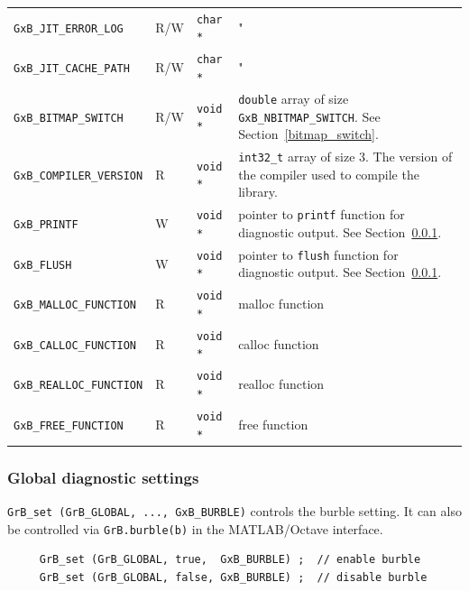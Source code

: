 {\begin{tabular}{|l|l|l|p{2.5in}|}
\verb'GxB_JIT_ERROR_LOG'            & R/W  & \verb'char *' & " \\
\verb'GxB_JIT_CACHE_PATH'           & R/W  & \verb'char *' & " \\
\hline
\verb'GxB_BITMAP_SWITCH'            & R/W  & \verb'void *' & \verb'double' array of size \newline
                                                                \verb'GxB_NBITMAP_SWITCH'.  \newline
                                                                See Section~\ref{bitmap_switch}. \\
\verb'GxB_COMPILER_VERSION'         & R    & \verb'void *' & \verb'int32_t' array of size 3.
                                        The version of the compiler used to
                                        compile the library. \\
\verb'GxB_PRINTF'                   & W    & \verb'void *' & pointer to \verb'printf' function for diagnostic output.
                                                                See Section~\ref{diag}. \\
\verb'GxB_FLUSH'                    & W    & \verb'void *' & pointer to \verb'flush' function for diagnostic output.
                                                                See Section~\ref{diag}. \\
\verb'GxB_MALLOC_FUNCTION'  & R    & \verb'void *' & malloc function \\
\verb'GxB_CALLOC_FUNCTION'  & R    & \verb'void *' & calloc function \\
\verb'GxB_REALLOC_FUNCTION' & R    & \verb'void *' & realloc function \\
\verb'GxB_FREE_FUNCTION'    & R    & \verb'void *' & free function \\
\hline
\end{tabular}
}

\subsubsection{Global diagnostic settings}
\label{diag}

\verb'GrB_set (GrB_GLOBAL, ..., GxB_BURBLE)' controls the burble setting.  It can also be
controlled via \verb'GrB.burble(b)' in the MATLAB/Octave interface.

{\footnotesize
\begin{verbatim}
     GrB_set (GrB_GLOBAL, true,  GxB_BURBLE) ;  // enable burble
     GrB_set (GrB_GLOBAL, false, GxB_BURBLE) ;  // disable burble \end{verbatim}}


